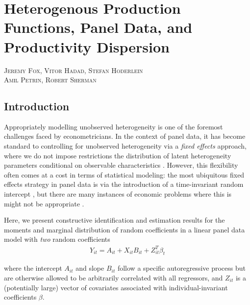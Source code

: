 \chapter*{Heterogenous Production Functions, Panel Data, and Productivity Dispersion}
\begin{center}
\large
\textsc{Jeremy Fox, Vitor Hadad, Stefan Hoderlein} \\ \textsc{Amil Petrin, Robert Sherman}
\end{center}

\doublespacing

\section{Introduction}

Appropriately modelling unobserved heterogeneity is one of the foremost challenges faced by econometricians.
In the context of panel data, it has become standard to controlling for unobserved heterogeneity via a \emph{fixed effects} approach, where we do not impose restrictions the distribution of latent heterogeneity parameters conditional on observable characteristics \citet{wooldridge2010econometric}. However, this flexibility often comes at a cost in terms of statistical modeling: the most ubiquitous fixed effects strategy in panel data is via the introduction of a time-invariant random intercept \citep{arellano2003panel}, but there are many instances of economic problems where this is might not be appropriate \citep{browning2007heterogeneity}.

Here, we present constructive identification and estimation results for the moments and marginal distribution of random coefficients in a linear panel data model with \emph{two} random coefficients
\begin{align}
  Y_{it} = A_{it} + X_{it}B_{it} + Z_{it}^{T}\beta_{t}
\end{align}

\noindent where the intercept $A_{it}$ and slope $B_{it}$ follow a specific autoregressive process but are otherwise allowed to be arbitrarily correlated with all regressors, and $Z_{it}$ is a (potentially large) vector of covariates associated with individual-invariant coefficients $\beta$.


